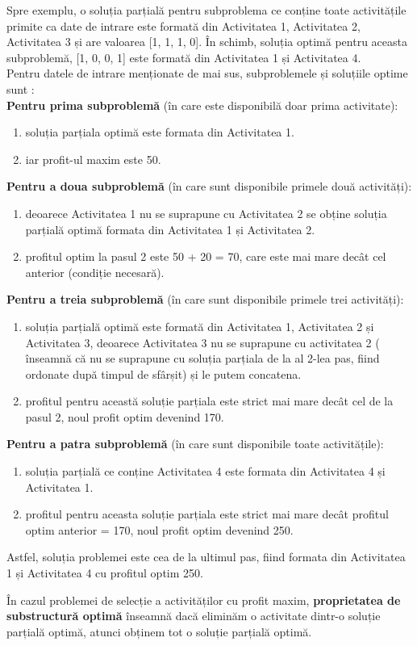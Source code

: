  Spre exemplu, o soluția parțială pentru subproblema ce conține toate activitățile primite ca date de intrare este formată din Activitatea 1, Activitatea 2, Activitatea 3 și are valoarea [1, 1, 1, 0]. În schimb, soluția optimă pentru aceasta subproblemă, [1, 0, 0, 1] este formată din Activitatea 1 și Activitatea 4. \\

Pentru datele de intrare menționate de mai sus, subproblemele și soluțiile optime sunt :\\
\textbf{Pentru prima subproblemă} (în care este disponibilă doar prima activitate):
\begin{enumerate}
    \item soluția parțiala optimă este formata din Activitatea 1.
    \item iar profit-ul maxim este 50. \\
\end{enumerate}
\textbf{Pentru a doua subproblemă} (în care sunt disponibile primele două activități):
\begin{enumerate}
    \item deoarece Activitatea 1 nu se suprapune cu Activitatea 2 se obține soluția parțială optimă formata din Activitatea 1 și Activitatea 2.
    \item profitul optim la pasul 2 este 50 + 20 = 70, care este mai mare decât cel anterior (condiție necesară).
\end{enumerate}
\textbf{Pentru a treia subproblemă} (în care sunt disponibile primele trei activități):
\begin{enumerate}
    \item soluția parțială optimă este formată din Activitatea 1, Activitatea 2 și Activitatea 3, deoarece Activitatea 3 nu se suprapune cu activitatea 2 ( înseamnă că nu se suprapune cu soluția parțiala de la al 2-lea pas, fiind ordonate după timpul de sfârșit) și le putem concatena.
    \item profitul pentru această soluție parțiala este strict mai mare decât cel de la pasul 2, noul profit optim devenind 170. \\
\end{enumerate}
\textbf{Pentru a patra subproblemă} (în care sunt disponibile toate activitățile):
\begin{enumerate}
    \item soluția parțială ce conține Activitatea 4 este formata din Activitatea 4 și Activitatea 1.
    \item profitul pentru aceasta soluție parțiala este strict mai mare decât profitul optim anterior = 170, noul profit optim devenind 250.
\end{enumerate} 
Astfel, soluția problemei este cea de la ultimul pas, fiind formata din Activitatea 1 și Activitatea 4  cu profitul optim 250. 

În cazul problemei de selecție a activităților cu profit maxim, \textbf{proprietatea de substructură optimă} înseamnă dacă eliminăm o activitate dintr-o soluție parțială optimă, atunci obținem tot o soluție parțială optimă.
